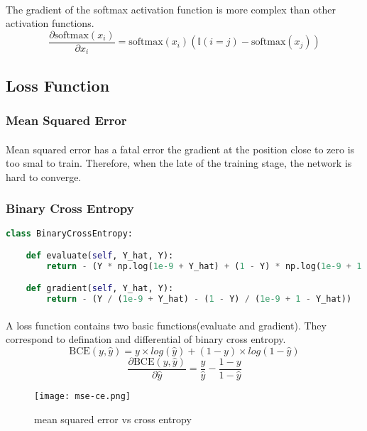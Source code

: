 \paragraph{}
The gradient of the softmax activation function is more complex than other activation functions.
$$\frac{\partial \text{softmax}(x_i)}{\partial x_i} = \text{softmax}(x_i)(\mathbb{I}(i = j) - \text{softmax}(x_j))$$
\subsection{Loss Function}
\subsubsection{Mean Squared Error}
\paragraph{}
Mean squared error has a fatal error the gradient at the position close to zero is too smal to train. Therefore, when the late of the training stage, the network is hard to converge.
\subsubsection{Binary Cross Entropy}
\begin{lstlisting}[language=Python]
class BinaryCrossEntropy:

    def evaluate(self, Y_hat, Y):
        return - (Y * np.log(1e-9 + Y_hat) + (1 - Y) * np.log(1e-9 + 1 - Y_hat))

    def gradient(self, Y_hat, Y):
        return - (Y / (1e-9 + Y_hat) - (1 - Y) / (1e-9 + 1 - Y_hat))
\end{lstlisting}
\paragraph{}
A loss function contains two basic functions(evaluate and gradient). They correspond to defination and differential of binary cross entropy.
$$\text{BCE}(y, \hat{y}) = y \times log(\hat {y}) + (1 - y) \times log(1 - \hat{y})$$
$$\frac{\partial \text{BCE}(y, \hat{y})}{\partial \hat{y}} = \frac{y}{\hat{y}} - \frac{1 - y}{1 - \hat{y}}$$

\begin{figure}[!ht]
    \begin{center} 
    \texttt{[image: mse-ce.png]} 
    \caption{mean squared error vs cross entropy}
    \end{center} 
\end{figure}
\newpage

